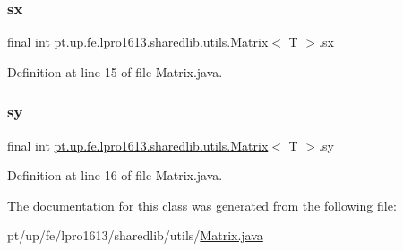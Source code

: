 \subsubsection{\texorpdfstring{sx}{sx}}
{\footnotesize\ttfamily final int \hyperlink{classpt_1_1up_1_1fe_1_1lpro1613_1_1sharedlib_1_1utils_1_1_matrix}{pt.\+up.\+fe.\+lpro1613.\+sharedlib.\+utils.\+Matrix}$<$ T $>$.sx}



Definition at line 15 of file Matrix.\+java.

\hypertarget{classpt_1_1up_1_1fe_1_1lpro1613_1_1sharedlib_1_1utils_1_1_matrix_ae47549088ae73a43f9b7da81608debbd}{}\label{classpt_1_1up_1_1fe_1_1lpro1613_1_1sharedlib_1_1utils_1_1_matrix_ae47549088ae73a43f9b7da81608debbd} 
\subsubsection{\texorpdfstring{sy}{sy}}
{\footnotesize\ttfamily final int \hyperlink{classpt_1_1up_1_1fe_1_1lpro1613_1_1sharedlib_1_1utils_1_1_matrix}{pt.\+up.\+fe.\+lpro1613.\+sharedlib.\+utils.\+Matrix}$<$ T $>$.sy}



Definition at line 16 of file Matrix.\+java.



The documentation for this class was generated from the following file\+:\begin{DoxyCompactItemize}
\item 
pt/up/fe/lpro1613/sharedlib/utils/\hyperlink{_matrix_8java}{Matrix.\+java}\end{DoxyCompactItemize}

